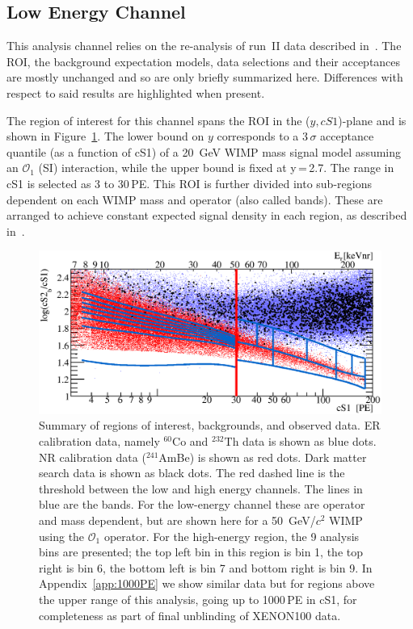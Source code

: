 
\subsection{Low Energy Channel}
\label{subsec:LowE}
This analysis channel relies on the re-analysis of run~II data described in~\cite{xe100_run_combination}. The ROI, the background 
expectation models, data selections and their acceptances are mostly unchanged and so are only briefly summarized here. Differences with respect to said results are highlighted when present.

The region of interest for this channel spans the ROI in the ($y,cS1$)-plane and is shown in Figure~\ref{fig:phasespace}.  The lower 
bound on $y$ corresponds to a 3\,$\sigma$ acceptance quantile (as a function of cS1) of a 20~GeV WIMP mass signal model assuming an $\mathcal{O}_1$ (SI) interaction, while the upper bound is fixed at y\,=\,2.7.
The range in cS1 is selected as 3 to 30\,PE. This ROI is further divided into sub-regions dependent on each WIMP mass and operator (also called bands). These are arranged to achieve constant expected signal density in each region, as described in~\cite{xe100_run_combination}.

\begin{figure}[]
\begin{minipage}{1\linewidth}
\centerline{\includegraphics[width=1\linewidth]{Figures/eft_sr.eps}}
\end{minipage}
\caption{Summary of regions of interest, backgrounds, and observed data. ER calibration data, namely $^{60}\mathrm{Co}$ and $^{232}\mathrm{Th}$ data is shown as blue dots. NR calibration data ($^{241}$AmBe) is shown as red dots. Dark matter search data is shown as black dots. The red dashed line is the threshold between the low and high energy channels. The lines in blue are the bands. For the low-energy channel these are operator and mass dependent, but are shown here for a 50~GeV/$c^2$ WIMP using the $\mathcal{O}_1$ operator. For the high-energy region, the 9 analysis bins are presented; the top left bin in this region is bin 1, the top right is bin 6, the bottom left is bin 7 and bottom right is bin 9. In Appendix~\ref{app:1000PE} we show similar data but for regions above the upper range of this analysis, going up to 1000\,PE in cS1, for completeness as part of final unblinding of XENON100 data. 
}
\label{fig:phasespace}
\end{figure}  


